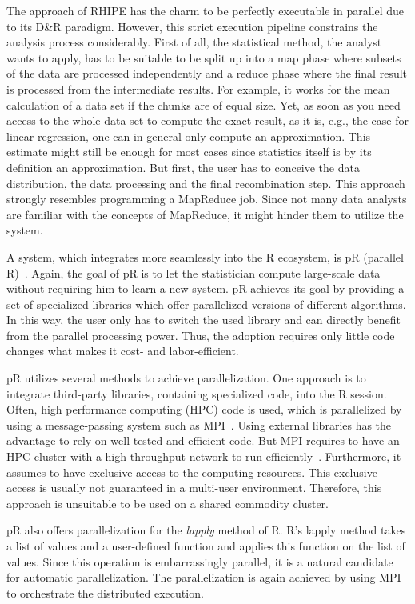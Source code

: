 The approach of RHIPE has the charm to be perfectly executable in parallel due to its D\&R paradigm.
However, this strict execution pipeline constrains the analysis process considerably.
First of all, the statistical method, the analyst wants to apply, has to be suitable to be split up into a map phase where subsets of the data are processed independently and a reduce phase where the final result is processed from the intermediate results.
For example, it works for the mean calculation of a data set if the chunks are of equal size.
Yet, as soon as you need access to the whole data set to compute the exact result, as it is, e.g., the case for linear regression, one can in general only compute an approximation.
This estimate might still be enough for most cases since statistics itself is by its definition an approximation.
But first, the user has to conceive the data distribution, the data processing and the final recombination step.
This approach strongly resembles programming a MapReduce job.
Since not many data analysts are familiar with the concepts of MapReduce, it might hinder them to utilize the system.

A system, which integrates more seamlessly into the R ecosystem, is pR (parallel R)~\cite{samatova:2009a}.
Again, the goal of pR is to let the statistician compute large-scale data without requiring him to learn a new system.
pR achieves its goal by providing a set of specialized libraries which offer parallelized versions of different algorithms.
In this way, the user only has to switch the used library and can directly benefit from the parallel processing power.
Thus, the adoption requires only little code changes what makes it cost- and labor-efficient.

pR utilizes several methods to achieve parallelization.
One approach is to integrate third-party libraries, containing specialized code, into the R session.
Often, high performance computing (HPC) code is used, which is parallelized by using a message-passing system such as MPI~\cite{gropp:pc1996a,lusk:2009a}.
Using external libraries has the advantage to rely on well tested and efficient code.
But MPI requires to have an HPC cluster with a high throughput network to run efficiently~\cite{sur:2006a}.
Furthermore, it assumes to have exclusive access to the computing resources.
This exclusive access is usually not guaranteed in a multi-user environment.
Therefore, this approach is unsuitable to be used on a shared commodity cluster.

pR also offers parallelization for the \emph{lapply} method of R.
R's lapply method takes a list of values and a user-defined function and applies this function on the list of values.
Since this operation is embarrassingly parallel, it is a natural candidate for automatic parallelization.
The parallelization is again achieved by using MPI to orchestrate the distributed execution.

